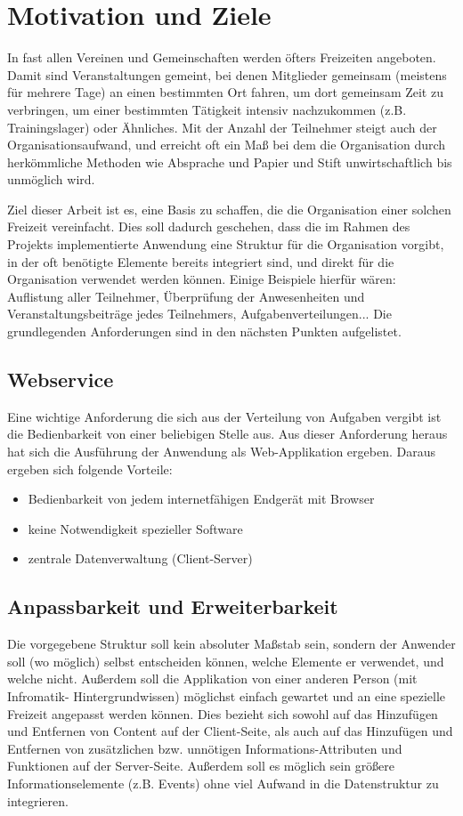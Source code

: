 \section{Motivation und Ziele}
In fast allen Vereinen und Gemeinschaften werden öfters Freizeiten angeboten. Damit sind Veranstaltungen gemeint, bei denen Mitglieder gemeinsam (meistens für mehrere Tage) an einen bestimmten Ort fahren, um dort gemeinsam Zeit zu verbringen, um einer bestimmten Tätigkeit intensiv nachzukommen (z.B. Trainingslager)  oder Ähnliches. Mit der Anzahl der Teilnehmer steigt auch der Organisationsaufwand, und erreicht oft ein Maß bei dem die Organisation durch herkömmliche Methoden wie Absprache und \glqq{}Papier und Stift\grqq{}  unwirtschaftlich bis unmöglich wird. 

Ziel dieser Arbeit ist es, eine Basis zu schaffen, die die Organisation einer solchen Freizeit vereinfacht. Dies soll dadurch geschehen, dass die im Rahmen des Projekts implementierte Anwendung eine Struktur für die Organisation vorgibt, in der oft benötigte Elemente bereits integriert sind, und direkt für die Organisation verwendet werden können. Einige Beispiele hierfür wären: Auflistung aller Teilnehmer, Überprüfung der Anwesenheiten und Veranstaltungsbeiträge jedes Teilnehmers, Aufgabenverteilungen... 
Die grundlegenden Anforderungen sind in den nächsten Punkten aufgelistet. 

\subsection{Webservice}
Eine wichtige Anforderung die sich aus der Verteilung von Aufgaben vergibt ist die Bedienbarkeit von einer beliebigen Stelle aus. Aus dieser Anforderung heraus hat sich die Ausführung der Anwendung als Web-Applikation ergeben. Daraus ergeben sich folgende Vorteile:

\begin{itemize}
	\item Bedienbarkeit von jedem internetfähigen Endgerät mit Browser
	\item keine Notwendigkeit spezieller Software
	\item zentrale Datenverwaltung (Client-Server)
\end{itemize}

\subsection{Anpassbarkeit und Erweiterbarkeit}
Die vorgegebene Struktur soll kein absoluter Maßstab sein, sondern der Anwender soll (wo möglich) selbst entscheiden können, welche Elemente er verwendet, und welche nicht.
Außerdem soll die Applikation von einer anderen Person (mit Infromatik- Hintergrundwissen) möglichst einfach gewartet und an eine spezielle Freizeit angepasst werden können. Dies bezieht sich sowohl auf das Hinzufügen und Entfernen von Content auf der Client-Seite, als auch auf das Hinzufügen und Entfernen von zusätzlichen bzw. unnötigen Informations-Attributen und Funktionen auf der Server-Seite. Außerdem soll es möglich sein größere Informationselemente (z.B. Events) ohne viel Aufwand in die Datenstruktur zu integrieren.

